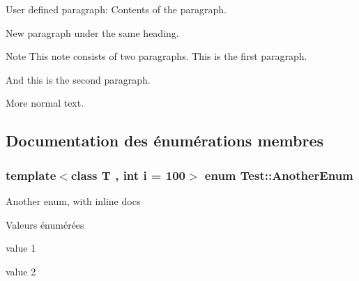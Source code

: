 \begin{DoxyParagraph}{User defined paragraph\+:}
Contents of the paragraph.
\end{DoxyParagraph}
\begin{DoxyParagraph}{}
New paragraph under the same heading.
\end{DoxyParagraph}
\begin{DoxyNote}{Note}
This note consists of two paragraphs. This is the first paragraph.
\end{DoxyNote}
\begin{DoxyParagraph}{}
And this is the second paragraph.
\end{DoxyParagraph}
More normal text. 

\subsection{Documentation des énumérations membres}
\hypertarget{class_test_a34b5b35cdcd492c108e62275d647bcf4}{}
\subsubsection[{Another\+Enum}]{\setlength{\rightskip}{0pt plus 5cm}template$<$class T , int i = 100$>$ enum {\bf Test\+::\+Another\+Enum}}\label{class_test_a34b5b35cdcd492c108e62275d647bcf4}
Another enum, with inline docs \begin{Desc}
\item[Valeurs énumérées]\par
\begin{description}
\item[{\em 
\hypertarget{class_test_a34b5b35cdcd492c108e62275d647bcf4a5e2c48aa2737365d177cfd29c88341f7}{}V1\label{class_test_a34b5b35cdcd492c108e62275d647bcf4a5e2c48aa2737365d177cfd29c88341f7}
}]value 1 \item[{\em 
\hypertarget{class_test_a34b5b35cdcd492c108e62275d647bcf4adb6734947779033dd3662483baa57be8}{}V2\label{class_test_a34b5b35cdcd492c108e62275d647bcf4adb6734947779033dd3662483baa57be8}
}]value 2 \end{description}
\end{Desc}
\hypertarget{class_test_a26bf93efdaea3c6e2cfa4119c3755d3f}{}
